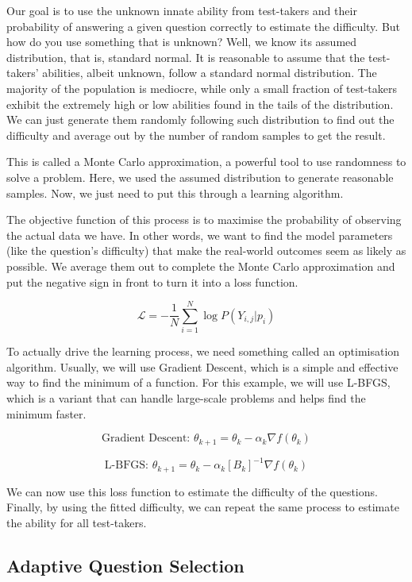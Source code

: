 \documentclass{article}
\begin{document}
Our goal is to use the unknown innate ability from test-takers and their probability of answering a given question correctly to estimate the difficulty. But how do you use something that is unknown? Well, we know its assumed distribution, that is, standard normal. It is reasonable to assume that the test-takers' abilities, albeit unknown, follow a standard normal distribution. The majority of the population is mediocre, while only a small fraction of test-takers exhibit the extremely high or low abilities found in the tails of the distribution. We can just generate them randomly following such distribution to find out the difficulty and average out by the number of random samples to get the result.

This is called a Monte Carlo approximation, a powerful tool to use randomness to solve a problem. Here, we used the assumed distribution to generate reasonable samples. Now, we just need to put this through a learning algorithm.

The objective function of this process is to maximise the probability of observing the actual data we have. In other words, we want to find the model parameters (like the question's difficulty) that make the real-world outcomes seem as likely as possible. We average them out to complete the Monte Carlo approximation and put the negative sign in front to turn it into a loss function.

\[
\mathcal{L} = -\frac{1}{N} \sum_{i=1}^{N}\log P(Y_{i,j} | p_i)
\]

To actually drive the learning process, we need something called an optimisation algorithm. Usually, we will use Gradient Descent, which is a simple and effective way to find the minimum of a function. For this example, we will use L-BFGS, which is a variant that can handle large-scale problems and helps find the minimum faster.

\[
\text{Gradient Descent: } \theta_{k+1} = \theta_k - \alpha_k \nabla f(\theta_k)
\]

\[
\text{L-BFGS: } \theta_{k+1} = \theta_k - \alpha_k [B_k]^{-1} \nabla f(\theta_k)
\]

We can now use this loss function to estimate the difficulty of the questions. Finally, by using the fitted difficulty, we can repeat the same process to estimate the ability for all test-takers.

\subsection*{Adaptive Question Selection}
\end{document}
